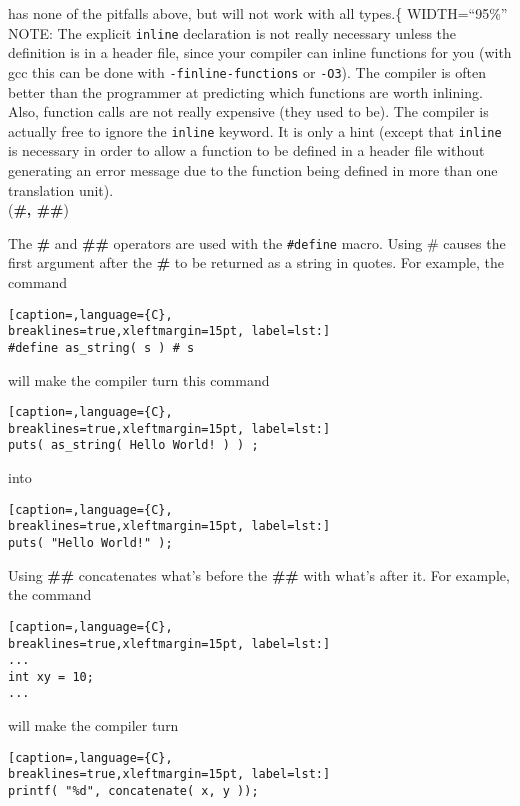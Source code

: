has none of the pitfalls above, but will not work with all types.\{\textbar{}
WIDTH=``95\%'' 
NOTE: The explicit \texttt{inline} declaration is not really
necessary unless the definition is in a header file, since your compiler can
inline functions for you (with gcc this can be done with
\texttt{-finline-functions} or \texttt{-O3}). The compiler is often better than
the programmer at predicting which functions are worth inlining. Also, function
calls are not really expensive (they used to be). The compiler is actually free
to ignore the \texttt{inline} keyword. It is only a hint (except that
\texttt{inline} is necessary in order to allow a function to be defined in a
header file without generating an error message due to the function being
defined in more than one translation unit). \\

(\textbf{\#, \#\#})

The \textbf{\#} and \textbf{\#\#} operators are used with the \texttt{\#define}
macro. Using \# causes the first argument after the \textbf{\#} to be returned
as a string in quotes. For example, the command 
\lstset{basicstyle=\scriptsize, numbers=left, captionpos=b, tabsize=4}
\begin{lstlisting}[caption=,language={C},
breaklines=true,xleftmargin=15pt, label=lst:]
#define as_string( s ) # s
\end{lstlisting}
		
will make the compiler turn this command 
\lstset{basicstyle=\scriptsize, numbers=left, captionpos=b, tabsize=4}
\begin{lstlisting}[caption=,language={C},
breaklines=true,xleftmargin=15pt, label=lst:]
puts( as_string( Hello World! ) ) ;
\end{lstlisting}
		
into 
\lstset{basicstyle=\scriptsize, numbers=left, captionpos=b, tabsize=4}
\begin{lstlisting}[caption=,language={C},
breaklines=true,xleftmargin=15pt, label=lst:]
puts( "Hello World!" );
\end{lstlisting}
		
Using \textbf{\#\#} concatenates what's before the \textbf{\#\#} with what's after it. For example, the command 
\lstset{basicstyle=\scriptsize, numbers=left, captionpos=b, tabsize=4}
\begin{lstlisting}[caption=,language={C},
breaklines=true,xleftmargin=15pt, label=lst:]
...
int xy = 10;
...
\end{lstlisting}
will make the compiler turn 
\lstset{basicstyle=\scriptsize, numbers=left, captionpos=b, tabsize=4}
\begin{lstlisting}[caption=,language={C},
breaklines=true,xleftmargin=15pt, label=lst:]
printf( "%d", concatenate( x, y ));
\end{lstlisting}
		
